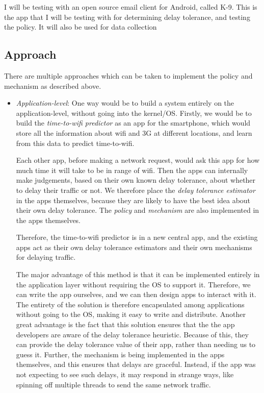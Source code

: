 \documentclass[12pt, fleqn]{article}
\begin{document}
I will be testing with an open source email client for Android, called K-9. This 
is the app that I will be testing with for determining delay tolerance, 
and testing the policy. It will also be used for data collection


\subsection{Approach}
\label{overview-approach}

There are multiple approaches which can be taken to implement the policy and 
mechanism as described above. 
\begin{itemize}
    \item \emph{Application-level}: One way would be to build a system 
    entirely on the application-level, without going into the kernel/OS. Firstly,
    we would be to build the \emph{time-to-wifi predictor} as an app for 
    the smartphone, which would store all the information about wifi and 3G 
    at different locations, and learn from this data to predict time-to-wifi.
    
  Each other app, before making a network request, would ask this app for how 
  much time it will take to be in range of wifi. Then the apps can internally 
  make judgements, based on their own known delay tolerance, about whether to 
  delay their traffic or not. We therefore place the \emph{delay tolerance estimator} in the apps 
  themselves, because they are likely to have the best idea about their own 
  delay tolerance. The \emph{policy} and \emph{mechanism} are also implemented in the apps 
  themselves. 
  
  Therefore, the time-to-wifi predictor is in a new central app, and the 
  existing apps act as their own delay tolerance estimators and their own mechanisms for 
  delaying traffic.
  
  The major advantage of this method is that it can be implemented entirely in 
  the application layer without requiring the OS to support it. Therefore, we 
  can write the app ourselves, and we can then design apps to interact with it. 
  The entirety of the solution is therefore encapsulated among applications 
  without going to the OS, making it easy to write and distribute. Another great 
  advantage is the fact that this solution ensures that the the app developers are aware 
  of the delay tolerance heuristic. Because of this, they can provide the delay 
  tolerance value of their app, rather than needing us to guess it. Further, the 
  mechanism is being implemented in the apps themselves, and this ensures that 
  delays are graceful. Instead, if the app was not expecting to see such delays, 
  it may respond in strange ways, like spinning off multiple threads to send 
  the same network traffic.
  

\end{itemize}
\end{document}
